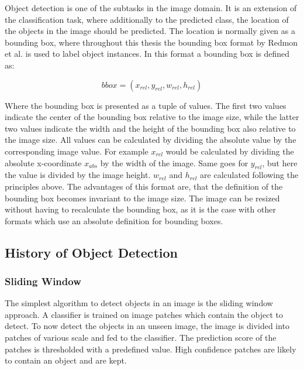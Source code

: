 Object detection is one of the subtasks in the image domain.
It is an extension of the classification task, where additionally to the predicted class, the location of the objects in the image should be predicted.
The location is normally given as a bounding box, where throughout this thesis the bounding box format by Redmon et al. \cite{yolov1} is used to label object instances.
In this format a bounding box is defined as:

\begin{equation}
    bbox = (x_{rel}, y_{rel}, w_{rel}, h_{rel})
\end{equation}

Where the bounding box is presented as a tuple of values.
The first two values indicate the center of the bounding box relative to the image size, while the latter two values indicate the width and the height of the bounding box also relative to the image size.
All values can be calculated by dividing the absolute value by the corresponding image value.
For example $x_{rel}$ would be calculated by dividing the absolute x-coordinate $x_{abs}$ by the width of the image.
Same goes for $y_{rel}$, but here the value is divided by the image height.
$w_{rel}$ and $h_{rel}$ are calculated following the principles above.
The advantages of this format are, that the definition of the bounding box becomes invariant to the image size.
The image can be resized without having to recalculate the bounding box, as it is the case with other formats which use an absolute definition for bounding boxes.

\subsection{History of Object Detection}
\label{sec:hostory_obj_detection}

\subsubsection{Sliding Window}
The simplest algorithm to detect objects in an image is the sliding window approach.
A classifier is trained on image patches which contain the object to detect.
To now detect the objects in an unseen image, the image is divided into patches of various scale and fed to the classifier.
The prediction score of the patches is thresholded with a predefined value.
High confidence patches are likely to contain an object and are kept. \cite{sliding_window_satelite}

